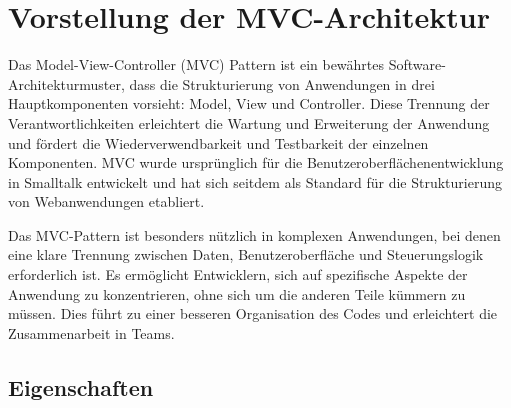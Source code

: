 
\chapter{Vorstellung der MVC-Architektur}
\label{chap:vorstellung}

Das Model-View-Controller (MVC) Pattern ist ein bewährtes Software-Architekturmuster, dass die Strukturierung von Anwendungen in drei Hauptkomponenten vorsieht: Model, View und Controller. Diese Trennung der Verantwortlichkeiten erleichtert die Wartung und Erweiterung der Anwendung und fördert die Wiederverwendbarkeit und Testbarkeit der einzelnen Komponenten. MVC wurde ursprünglich für die Benutzeroberflächenentwicklung in Smalltalk entwickelt und hat sich seitdem als Standard für die Strukturierung von Webanwendungen etabliert.

Das MVC-Pattern ist besonders nützlich in komplexen Anwendungen, bei denen eine klare Trennung zwischen Daten, Benutzeroberfläche und Steuerungslogik erforderlich ist. Es ermöglicht Entwicklern, sich auf spezifische Aspekte der Anwendung zu konzentrieren, ohne sich um die anderen Teile kümmern zu müssen. Dies führt zu einer besseren Organisation des Codes und erleichtert die Zusammenarbeit in Teams.


\section{Eigenschaften}

